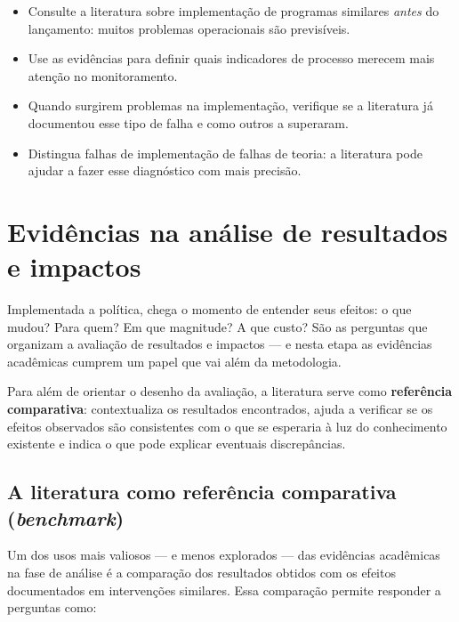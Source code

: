 \documentclass[12pt, a4paper, openany]{book}
\begin{document}
\begin{notabox}
\begin{itemize}[leftmargin=*]
  \item Consulte a literatura sobre implementação de programas similares
    \emph{antes} do lançamento: muitos problemas operacionais são
    previsíveis.
  \item Use as evidências para definir quais indicadores de processo merecem
    mais atenção no monitoramento.
  \item Quando surgirem problemas na implementação, verifique se a literatura
    já documentou esse tipo de falha e como outros a superaram.
  \item Distingua falhas de implementação de falhas de teoria: a literatura
    pode ajudar a fazer esse diagnóstico com mais precisão.
\end{itemize}
\end{notabox}

\chapter{Evidências na análise de resultados e impactos}\label{cap6}

Implementada a política, chega o momento de entender seus efeitos: o que mudou? Para quem? Em que magnitude? A que custo? São as perguntas que organizam a avaliação de resultados e impactos --- e nesta etapa as evidências acadêmicas cumprem um papel que vai além da metodologia.

Para além de orientar o desenho da avaliação, a literatura serve como \textbf{referência comparativa}: contextualiza os resultados encontrados, ajuda a verificar se os efeitos observados são consistentes com o que se esperaria à luz do conhecimento existente e indica o que pode explicar eventuais discrepâncias.

\section{A literatura como referência comparativa (\textit{benchmark})}

Um dos usos mais valiosos --- e menos explorados --- das evidências acadêmicas
na fase de análise é a comparação dos resultados obtidos com os efeitos
documentados em intervenções similares. Essa comparação permite responder a
perguntas como:
\end{document}

